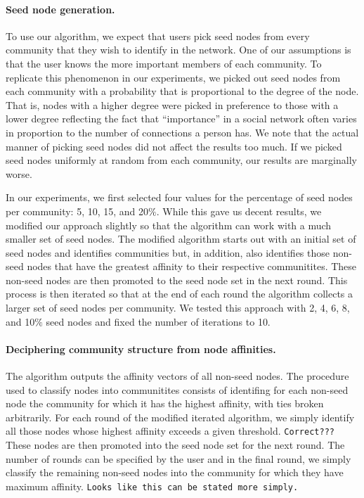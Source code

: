 \paragraph{Seed node generation.} 
To use our algorithm, we expect that users pick seed nodes from 
every community that they wish to identify in the network. One of our assumptions is that
the user knows the more important members of each community. To replicate 
this phenomenon in our experiments, we picked out seed nodes from each community 
with a probability that is proportional to the degree of the node. That is, nodes
with a higher degree were picked in preference to those with a lower degree reflecting the 
fact that ``importance'' in a social network often varies in proportion to the number of 
connections a person has. We note that the actual manner of picking seed nodes did not 
affect the results too much. If we picked seed nodes uniformly at random from each community, 
our results are marginally worse. 

In our experiments, we first selected four values for the percentage of seed nodes 
per community: 5, 10, 15, and 20$\%$. While this gave us decent results, we modified our 
approach slightly so that the algorithm can work with a much smaller set of seed nodes. 
The modified algorithm starts out with an initial set of seed nodes and identifies 
communities but, in addition, also identifies those non-seed nodes that have the 
greatest affinity to their respective communitites. These non-seed nodes are then promoted 
to the seed node set in the next round. This process is then iterated so that at the end of each 
round the algorithm collects a larger set of seed nodes per community. We tested this approach with 
2, 4, 6, 8, and 10$\%$ seed nodes and fixed the number of iterations to 10. 

\paragraph{Deciphering community structure from node affinities.}
The algorithm outputs the affinity vectors of all non-seed nodes. The procedure 
used to classify nodes into communitites consists of identifing for each non-seed 
node the community for which it has the highest affinity, with ties broken arbitrarily. 
For each round of the modified iterated algorithm, we simply identify all those nodes 
whose highest affinity exceeds a given threshold. \texttt{Correct???} These nodes are then 
promoted into the seed node set for the next round. The number of rounds can be specified by 
the user and in the final round, we simply classify the remaining non-seed nodes into the community
for which they have maximum affinity. \texttt{Looks like this can be stated more simply.}

